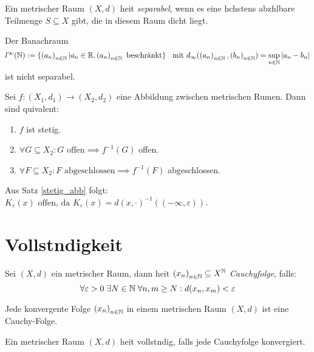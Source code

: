 \begin{definition}
	Ein metrischer Raum \((X, d)\) hei\s t \textit{separabel}, wenn es eine h\os chstens abz\as hlbare Teilmenge \(S\subseteq X\) gibt, die in diesem Raum dicht liegt.
\end{definition}
\begin{ex}
	Der Banachraum 
	\[l^\infty(\mathbb{N}) := \{\left (a_n\right )_{n\in \mathbb{N}} \vert a_n \in \mathbb{R}, \left (a_n\right )_{n\in \mathbb{N}} \text { beschr{\"a}nkt}\} \;\; \text{ mit } d_\infty(\left (a_n\right )_{n\in \mathbb{N}}, \left (b_n\right )_{n\in \mathbb{N}}) = \sup_{n\in \mathbb{N}} \left\lvert a_n - b_n \right\rvert\] 
	ist nicht separabel.
\end{ex}

\begin{theorem}
	\label{stetig_abb}Sei \(f: (X_1, d_1) \to (X_2, d_2)\) eine Abbildung zwischen metrischen R\as umen. Dann sind \as quivalent:
	\begin{enumerate}[noitemsep]
		\item $f$ ist stetig.
		\item \(\forall G \subseteq X_2: G \text{ offen} \implies f^{-1}(G)\) offen.
		\item \(\forall F \subseteq X_2: F \text{ abgeschlossen} \implies f^{-1}(F)\) abgeschlossen.
	\end{enumerate}
\end{theorem}

\begin{rem}
	Aus Satz \ref{stetig_abb} folgt: 
	\(K_\varepsilon(x) \text{ offen, da } K_\varepsilon(x) = d(x, \cdot)^{-1}((-\infty, \varepsilon))\).
\end{rem}

\section{Vollst\as ndigkeit}

\begin{definition}
	Sei $(X,d)$ ein metrischer Raum, dann hei\s t $\left (x_n\right )_{n\in \mathbb{N}} \subseteq X^{\mathbb{N}}$ \textit{Cauchyfolge}, falls:
	\[\forall \varepsilon > 0 \; \exists N \in \mathbb{N} \; \forall n, m \geq N: d(x_n, x_m) < \varepsilon\]
\end{definition}

\begin{theorem}
	Jede konvergente Folge $\left (x_n\right )_{n\in \mathbb{N}}$ in einem metrischen Raum $(X, d)$ ist eine Cauchy-Folge.
\end{theorem}

\begin{definition}
	Ein metrischer Raum $(X, d)$ hei\s t vollst\as ndig, falls jede Cauchyfolge konvergiert.
\end{definition}

